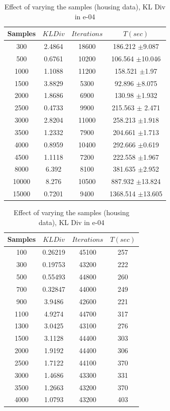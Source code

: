 \documentclass{acm_proc_article-sp}
\begin{document}
\begin{table}[htdp]
\parbox{.39\linewidth}{
\centering
\begin{tabular}{| c | c | c | c |}
\hline
Samples & $KL Div$ & $Iterations$& $T(sec)$ \\
\hline
300 & 2.4864 & 18600 & 186.212 $\pm$9.087  \\
500 & 0.6761 & 10200 & 106.564 $\pm$10.046 \\
1000 & 1.1088 & 11200 & 158.521 $\pm$1.97  \\
1500 & 3.8829 & 5300 & 92.896 $\pm$8.075  \\
2000 & 1.8686 & 6900 & 130.98 $\pm$1.932 \\
2500 & 0.4733 & 9900 & 215.563 $\pm$ 2.471 \\
3000 & 2.8204 & 11000 & 258.213 $\pm1.918$ \\
3500 & 1.2332 & 7900 & 204.661 $\pm$1.713 \\
4000 & 0.8959 & 10400 & 292.666 $\pm$0.619 \\
4500 & 1.1118 & 7200 & 222.558 $\pm$1.967 \\
8000 & 6.392 & 8100 & 381.635 $\pm$2.952  \\
10000 & 8.276 & 10500 & 887.932 $\pm$13.824  \\
15000 & 0.7201 & 9400 & 1368.514 $\pm$13.605  \\
\hline
\end{tabular}
\caption{Effect of varying the samples (REDD)}
\label{table:sample1}}
\hfill
\parbox{.65\linewidth}{
\centering
\begin{tabular}{| c | c | c | c |}
\hline
Samples & $KL Div$  & $Iterations$ & $T(sec)$\\
\hline
100 & 0.26219 & 45100 & 257  \\
300 & 0.19753 & 43200 & 222 \\
500 & 0.55493 & 44800 & 260  \\
700 & 0.32847 & 44000 & 249 \\
900 & 3.9486 & 42600 & 221  \\
1100 & 4.9274 & 44700 & 317  \\
1300 & 3.0425 & 43100 & 276 \\
1500 &  3.1128 & 44400 & 303 \\
2000 & 1.9192 & 44400 & 306 \\
2500 & 1.7122 & 44100 & 370 \\
3000 & 1.4686 & 43300 & 331 \\
3500 & 1.2663 & 43200 & 370  \\
4000 & 1.0793 & 43200 & 403  \\
\hline
\end{tabular}
\caption{Effect of varying the samples (housing data), KL Div in e-04}
\label{table:sample2}}
\end{table}
\end{document}
